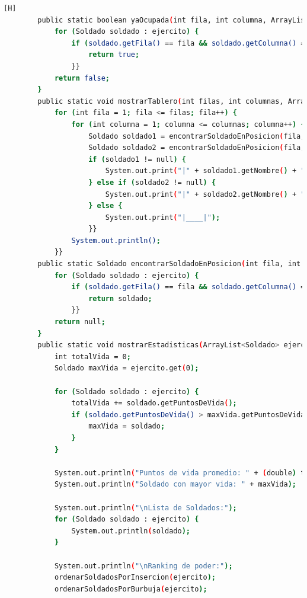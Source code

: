 \documentclass{article}
\begin{document}
\begin{lstlisting}[language=bash,caption={Creando la clase principal de VideoJuego_v4.java}][H]
	    public static boolean yaOcupada(int fila, int columna, ArrayList<Soldado> ejercito) {
	        for (Soldado soldado : ejercito) {
	            if (soldado.getFila() == fila && soldado.getColumna() == columna) {
	                return true;
	            }}
	        return false;
	    }
	    public static void mostrarTablero(int filas, int columnas, ArrayList<Soldado> ejercito1, ArrayList<Soldado> ejercito2) {
	        for (int fila = 1; fila <= filas; fila++) {
	            for (int columna = 1; columna <= columnas; columna++) { 
	                Soldado soldado1 = encontrarSoldadoEnPosicion(fila, columna, ejercito1);
	                Soldado soldado2 = encontrarSoldadoEnPosicion(fila, columna, ejercito2);
	                if (soldado1 != null) {
	                    System.out.print("|" + soldado1.getNombre() + "|");
	                } else if (soldado2 != null) {
	                    System.out.print("|" + soldado2.getNombre() + "|");
	                } else {
	                    System.out.print("|____|");
	                }}
	            System.out.println(); 
	        }}
	    public static Soldado encontrarSoldadoEnPosicion(int fila, int columna, ArrayList<Soldado> ejercito) {
	        for (Soldado soldado : ejercito) {
	            if (soldado.getFila() == fila && soldado.getColumna() == columna) {
	                return soldado;
	            }}
	        return null;
	    }
	    public static void mostrarEstadisticas(ArrayList<Soldado> ejercito) {
	        int totalVida = 0;
	        Soldado maxVida = ejercito.get(0);

	        for (Soldado soldado : ejercito) {
	            totalVida += soldado.getPuntosDeVida();
	            if (soldado.getPuntosDeVida() > maxVida.getPuntosDeVida()) {
	                maxVida = soldado;
	            }
	        }

	        System.out.println("Puntos de vida promedio: " + (double) totalVida / ejercito.size());
	        System.out.println("Soldado con mayor vida: " + maxVida);

	        System.out.println("\nLista de Soldados:");
	        for (Soldado soldado : ejercito) {
	            System.out.println(soldado);
	        }

	        System.out.println("\nRanking de poder:");
	        ordenarSoldadosPorInsercion(ejercito);
	        ordenarSoldadosPorBurbuja(ejercito);
	        

\end{lstlisting}
\end{document}
